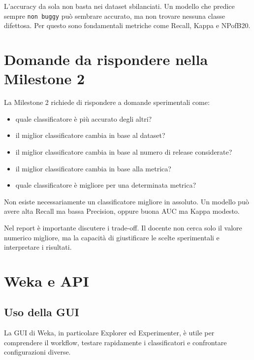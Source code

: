 \begin{notaesame}
L'accuracy da sola non basta nei dataset sbilanciati. Un modello che predice sempre \texttt{non buggy} può sembrare accurato, ma non trovare nessuna classe difettosa. Per questo sono fondamentali metriche come Recall, Kappa e NPofB20.
\end{notaesame}

\section{Domande da rispondere nella Milestone 2}

La Milestone 2 richiede di rispondere a domande sperimentali come:

\begin{itemize}
    \item quale classificatore è più accurato degli altri?
    \item il miglior classificatore cambia in base al dataset?
    \item il miglior classificatore cambia in base al numero di release considerate?
    \item il miglior classificatore cambia in base alla metrica?
    \item quale classificatore è migliore per una determinata metrica?
\end{itemize}

Non esiste necessariamente un classificatore migliore in assoluto. Un modello può avere alta Recall ma bassa Precision, oppure buona AUC ma Kappa modesto.

\begin{notaesame}
Nel report è importante discutere i trade-off. Il docente non cerca solo il valore numerico migliore, ma la capacità di giustificare le scelte sperimentali e interpretare i risultati.
\end{notaesame}

\section{Weka e API}

\subsection{Uso della GUI}

La GUI di Weka, in particolare Explorer ed Experimenter, è utile per comprendere il workflow, testare rapidamente i classificatori e confrontare configurazioni diverse.

